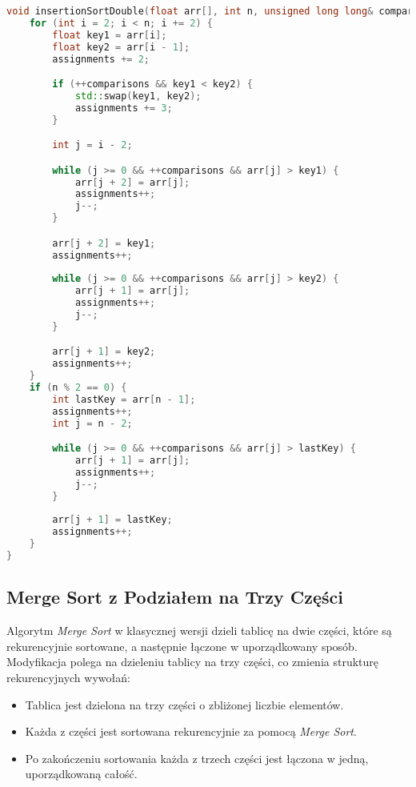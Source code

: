 \documentclass[a4paper,12pt]{article}
\begin{document}
\newpage
\begin{lstlisting}[language=C++,caption=Insertion Sort z wstawianiem dwóch elementów]
void insertionSortDouble(float arr[], int n, unsigned long long& comparisons, unsigned long long& assignments) {    
    for (int i = 2; i < n; i += 2) {
        float key1 = arr[i];
        float key2 = arr[i - 1];
        assignments += 2;

        if (++comparisons && key1 < key2) {
            std::swap(key1, key2);
            assignments += 3;
        }

        int j = i - 2;

        while (j >= 0 && ++comparisons && arr[j] > key1) {
            arr[j + 2] = arr[j];
            assignments++;
            j--;
        }

        arr[j + 2] = key1;
        assignments++;
        
        while (j >= 0 && ++comparisons && arr[j] > key2) {
            arr[j + 1] = arr[j];
            assignments++;
            j--;
        }

        arr[j + 1] = key2;
        assignments++;
    }
    if (n % 2 == 0) {
        int lastKey = arr[n - 1];
        assignments++;
        int j = n - 2;

        while (j >= 0 && ++comparisons && arr[j] > lastKey) {
            arr[j + 1] = arr[j];
            assignments++;
            j--;
        }
        
        arr[j + 1] = lastKey;
        assignments++;
    }
}

\end{lstlisting}

\subsection{Merge Sort z Podziałem na Trzy Części}
Algorytm \textit{Merge Sort} w klasycznej wersji dzieli tablicę na dwie części, które są rekurencyjnie sortowane, a następnie łączone w uporządkowany sposób. Modyfikacja polega na dzieleniu tablicy na trzy części, co zmienia strukturę rekurencyjnych wywołań:
\begin{itemize}
    \item Tablica jest dzielona na trzy części o zbliżonej liczbie elementów.
    \item Każda z części jest sortowana rekurencyjnie za pomocą \textit{Merge Sort}.
    \item Po zakończeniu sortowania każda z trzech części jest łączona w jedną, uporządkowaną całość.
\end{itemize}
\end{document}
